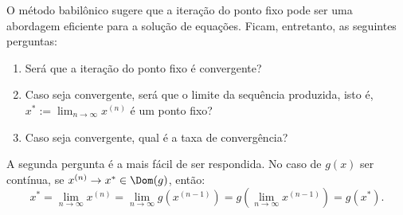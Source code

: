 
O método babilônico sugere que a iteração do ponto fixo pode ser uma abordagem eficiente para a solução de equações. Ficam, entretanto, as seguintes perguntas:
\begin{enumerate}
\item Será que a iteração do ponto fixo é convergente?
\item Caso seja convergente, será que o limite da sequência produzida, isto é, $x^* := \lim_{n\to \infty }x^{(n)}$ é um ponto fixo?
\item Caso seja convergente, qual é a taxa de convergência?
\end{enumerate}

A segunda pergunta é a mais fácil de ser respondida. No caso de $g(x)$ ser contínua, se $x^{(n)}\to x^*\in\Dom(g)$, então:
\begin{equation}
  x^* = \lim_{n\to\infty} x^{(n)} = \lim_{n\to\infty} g(x^{(n-1)}) = g\left(\lim_{n\to\infty} x^{(n-1)}\right) = g(x^*).
\end{equation}


